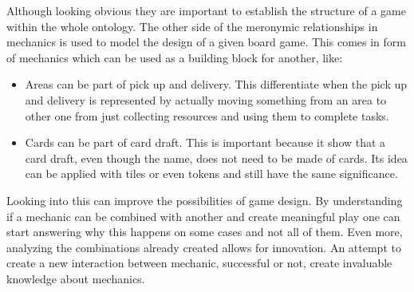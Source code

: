 Although looking obvious they are important to establish the structure of a game within the whole ontology. The other side of the meronymic relationships in mechanics is used to model the design of a given board game. This comes in form of mechanics which can be used as a building block for another, like:
\begin{itemize}
    \item Areas can be part of pick up and delivery. This differentiate when the pick up and delivery is represented by actually moving something from an area to other one from just collecting resources and using them to complete tasks.
    \item Cards can be part of card draft. This is important because it show that a card draft, even though the name, does not need to be made of cards. Its idea can be applied with tiles or even tokens and still have the same significance.
\end{itemize} 

Looking into this can improve the possibilities of game design. By understanding if a mechanic can be combined with another and create meaningful play one can start answering why this happens on some cases and not all of them. Even more, analyzing the combinations already created allows for innovation. An attempt to create a new interaction between mechanic, successful or not, create invaluable knowledge about mechanics.
